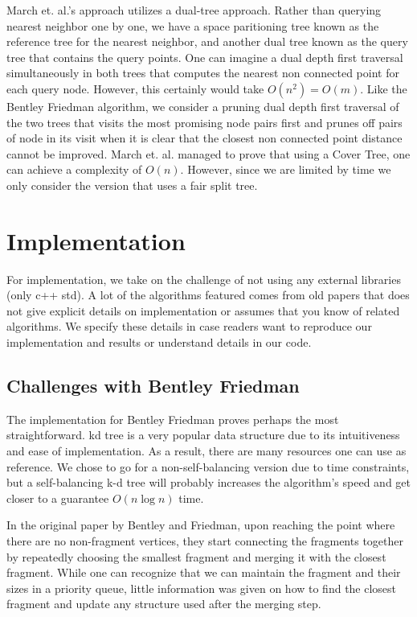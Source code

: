 \documentclass[11pt]{article}
\begin{document}
March et. al.'s approach utilizes a dual-tree approach. Rather than querying nearest neighbor one by one, we have a space paritioning tree known as the reference tree for the nearest neighbor, and another dual tree known as the query tree that contains the query points. One can imagine a dual depth first traversal simultaneously in both trees that computes the nearest non connected point for each query node. However, this certainly would take $O(n^2) = O(m)$. Like the Bentley Friedman algorithm, we consider a pruning dual depth first traversal of the two trees that visits the most promising node pairs first and prunes off pairs of node in its visit when it is clear that the closest non connected point distance cannot be improved. March et. al. managed to prove that using a Cover Tree, one can achieve a complexity of $O(n)$. However, since we are limited by time we only consider the version that uses a fair split tree.

\section{Implementation}

For implementation, we take on the challenge of not using any external libraries (only c++ std). A lot of the algorithms featured comes from old papers that does not give explicit details on implementation or assumes that you know of related algorithms. We specify these details in case readers want to reproduce our implementation and results or understand details in our code. 

\subsection{Challenges with Bentley Friedman}

The implementation for Bentley Friedman proves perhaps the most straightforward. kd tree is a very popular data structure due to its intuitiveness and ease of implementation. As a result, there are many resources one can use as reference. We chose to go for a non-self-balancing version due to time constraints, but a self-balancing k-d tree will probably increases the algorithm's speed and get closer to a guarantee $O(n\log{n})$ time.

In the original paper by Bentley and Friedman, upon reaching the point where there are no non-fragment vertices, they start connecting the fragments together by repeatedly choosing the smallest fragment and merging it with the closest fragment.\cite{Friedman} While one can recognize that we can maintain the fragment and their sizes in a priority queue, little information was given on how to find the closest fragment and update any structure used after the merging step.  
\end{document}
